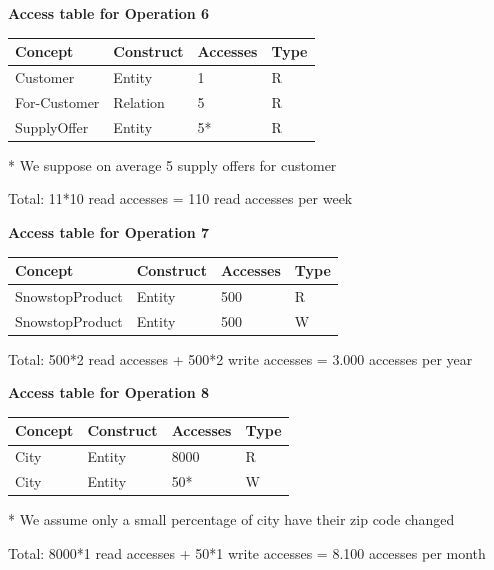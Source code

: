 \documentclass{article}[h]
\begin{document}
\pagebreak

{\centering \textbf{Access table for Operation 6}\\}
\begin{table}[H]
  \def\arraystretch{1.10}%
  \centering
  \begin{tabular}{ | m{4cm} | m{4cm}| m{3cm} | m{2cm} |} 
    \hline
    {\textbf{\large Concept}} & {\textbf{\large Construct}} & {\textbf{\large Accesses}} & {\textbf{\large Type}} \\
    \hline
    \color[HTML]{3531FF} Customer & Entity & 1 & R \\ 
    \hline
    \color[HTML]{3531FF} For-Customer & Relation & 5 & R \\ 
    \hline
    \color[HTML]{3531FF} SupplyOffer & Entity & 5* & R \\ 
    \hline
  \end{tabular}
  \small{* We suppose on average 5 supply offers for customer}
\end{table}
Total: 11*10 read accesses = 110 read accesses per week

\vspace{12px}

{\centering \textbf{Access table for Operation 7}\\}
\begin{table}[H]
  \def\arraystretch{1.10}%
  \centering
  \begin{tabular}{ | m{4cm} | m{4cm}| m{3cm} | m{2cm} |} 
    \hline
    {\textbf{\large Concept}} & {\textbf{\large Construct}} & {\textbf{\large Accesses}} & {\textbf{\large Type}} \\
    \hline
    \color[HTML]{3531FF} SnowstopProduct & Entity & 500 & R \\ 
    \hline
    \color[HTML]{3531FF} SnowstopProduct & Entity & 500 & W \\ 
    \hline
  \end{tabular}
\end{table}
Total: 500*2 read accesses + 500*2 write accesses = 3.000 accesses per year

\vspace{12px}

{\centering \textbf{Access table for Operation 8}\\}
\begin{table}[H]
  \def\arraystretch{1.10}%
  \centering
  \begin{tabular}{ | m{4cm} | m{4cm}| m{3cm} | m{2cm} |} 
    \hline
    {\textbf{\large Concept}} & {\textbf{\large Construct}} & {\textbf{\large Accesses}} & {\textbf{\large Type}} \\
    \hline
    \color[HTML]{3531FF} City & Entity & 8000 & R \\ 
    \hline
    \color[HTML]{3531FF} City & Entity & 50* & W \\ 
    \hline
  \end{tabular}
  \small{* We assume only a small percentage of city have their zip code changed}
\end{table}
Total: 8000*1 read accesses + 50*1 write accesses = 8.100 accesses per month
\end{document}
